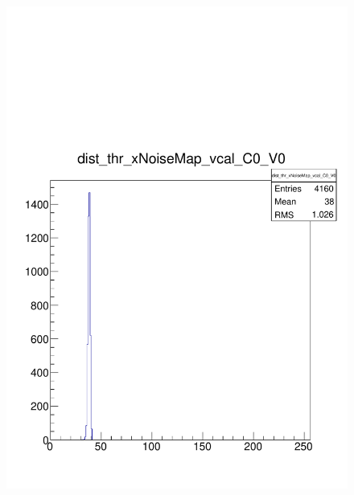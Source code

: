 \documentclass[a4paper,12pt,twoside]{article}
\begin{document}
\begin{figure} [h!]
\begin{minipage}{.48\textwidth}
  \includegraphics[width=\textwidth]{./Figures/HRSCurves_thrDist.pdf}
  \label{HRSCurves-thrDist}
\end{minipage}
\end{figure}
\end{document}
